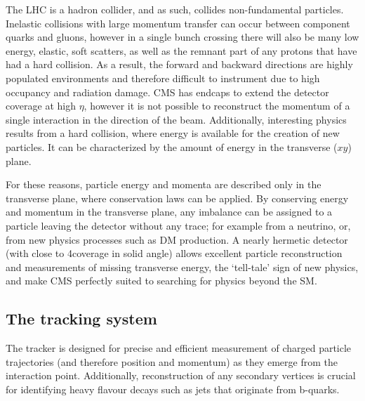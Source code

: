 The \ac{LHC} is a hadron collider, and as such, collides non-fundamental particles. 
Inelastic collisions with large momentum transfer can occur between component quarks and gluons, however in a single bunch crossing there will also be many low energy, elastic, soft scatters, 
as well as the remnant part of any protons that have had a hard collision. 
As a result, the forward and backward directions are highly populated environments and therefore difficult to instrument due to high occupancy and radiation damage. 
\ac{CMS} has endcaps to extend the detector coverage at high $\eta$, however it is not possible to reconstruct the momentum of a single interaction in the direction of the beam.   
Additionally, interesting physics results from a hard collision, where energy is available for the creation of new particles. 
It can be characterized by the amount of energy in the transverse ($xy$) plane. 

For these reasons, particle energy and momenta are described only in the transverse plane, where conservation laws can be applied.
By conserving energy and momentum in the transverse plane, any imbalance can be assigned to a particle leaving the detector without any trace; for example from a neutrino, or, from new physics processes such as \ac{DM} production. 
A nearly hermetic detector (with close to 4\pi coverage in solid angle) allows excellent particle reconstruction and measurements of missing transverse energy, the `tell-tale' sign of new physics, and make \ac{CMS} perfectly suited to searching for physics beyond the \ac{SM}.


\subsection{The tracking system}
The tracker is designed for precise and efficient measurement of charged particle trajectories (and therefore position and momentum) as they emerge from the interaction point.
Additionally, reconstruction of any secondary vertices is crucial for identifying heavy flavour decays such as jets that originate from b-quarks.

